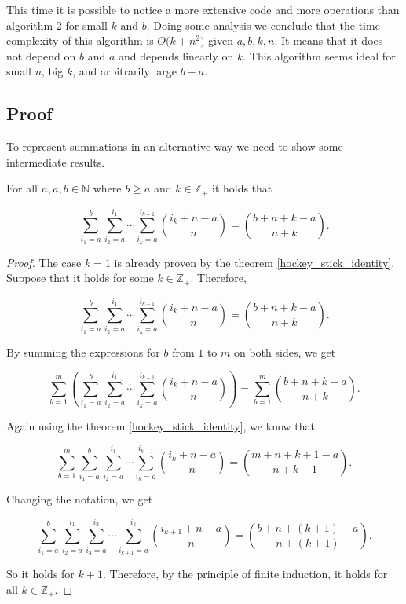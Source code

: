 \documentclass[12pt]{article}
\begin{document}
This time it is possible to notice a more extensive code and more operations than algorithm 2 for small $k$ and $b$. Doing some analysis we conclude that the time complexity of this algorithm is $O\Big(k + n^2\Big)$ given $a, b, k, n$. It means that it does not depend on $b$ and $a$ and depends linearly on $k$. This algorithm seems ideal for small $n$, big $k$, and arbitrarily large $b - a$.

\subsection{Proof}

To represent summations in an alternative way we need to show some intermediate results.

\vspace{20px}

\begin{theorem}
    \label{expanded_hockey_stick_identity}

    For all $n, a, b \in \mathbb{N}$ where $b \geq a$ and $k \in \mathbb{Z_+}$ it holds that

    $$
        \sum_{i_1=a}^{b}\sum_{i_2=a}^{i_1} \cdots \sum_{i_k=a}^{i_{k-1}} \binom{i_k+n-a}{n} = \binom{b+n+k-a}{n+k}.
    $$

\end{theorem}

\begin{proof}

    The case $k = 1$ is already proven by the theorem \ref{hockey_stick_identity}. Suppose that it holds for some $k \in \mathbb{Z_+}$. Therefore,

    $$
        \sum_{i_1=a}^{b}\sum_{i_2=a}^{i_1} \cdots \sum_{i_k=a}^{i_{k-1}} \binom{i_k+n-a}{n} = \binom{b+n+k-a}{n+k}.
    $$

    By summing the expressions for $b$ from $1$ to $m$ on both sides, we get

    $$
        \sum_{b=1}^{m} \left( \sum_{i_1=a}^{b}\sum_{i_2=a}^{i_1} \cdots \sum_{i_k=a}^{i_{k-1}} \binom{i_k+n-a}{n} \right) = \sum_{b=1}^{m} \binom{b+n+k-a}{n+k}.
    $$

    Again using the theorem \ref{hockey_stick_identity}, we know that

    $$
        \sum_{b=1}^{m} \sum_{i_1=a}^{b}\sum_{i_2=a}^{i_1} \cdots \sum_{i_k=a}^{i_{k-1}} \binom{i_k+n-a}{n} = \binom{m+n+k+1-a}{n+k+1}.
    $$

    Changing the notation, we get

    $$
        \boxed{\sum_{i_1=a}^{b} \sum_{i_2=a}^{i_1}\sum_{i_3=a}^{i_2} \cdots \sum_{i_{k+1}=a}^{i_k} \binom{i_{k+1}+n-a}{n} = \binom{b+n+(k+1)-a}{n+(k+1)}}.
    $$

    So it holds for $k+1$. Therefore, by the principle of finite induction, it holds for all $k \in \mathbb{Z_+}$.

\end{proof}
\end{document}
